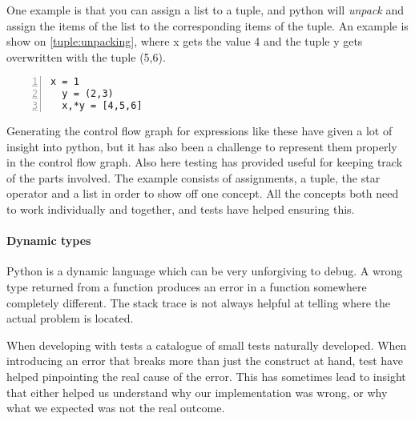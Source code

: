 One example is that you can assign a list to a tuple, and python will \emph{unpack} and assign the items of the list to the corresponding items of the tuple.
An example is show on \cref{tuple:unpacking}, where x gets the value 4 and the tuple y gets overwritten with the tuple (5,6).
\begin{lstlisting}[caption={Tuple unpacking}, label=tuple:unpacking, numbers=left, frame=single, linewidth=6cm]
  x = 1
  y = (2,3)
  x,*y = [4,5,6]
\end{lstlisting}

Generating the control flow graph for expressions like these have given a lot of insight into python, but it has also been a challenge to represent them properly in the control flow graph.
Also here testing has provided useful for keeping track of the parts involved.
The example consists of assignments, a tuple, the star operator and a list in order to show off one concept.
All the concepts both need to work individually and together, and tests have helped ensuring this.

\paragraph{Dynamic types}
Python is a dynamic language which can be very unforgiving to debug.
A wrong type returned from a function produces an error in a function somewhere completely different.
The stack trace is not always helpful at telling where the actual problem is located.

When developing with tests a catalogue of small tests naturally developed.
When introducing an error that breaks more than just the construct at hand, test have helped pinpointing the real cause of the error.
This has sometimes lead to insight that either helped us understand why our implementation was wrong, or why what we expected was not the real outcome.
